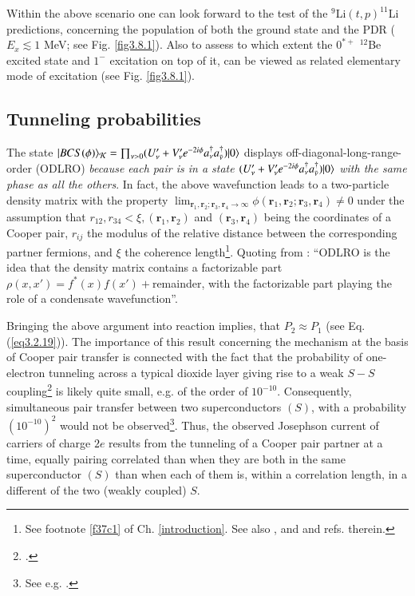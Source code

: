 Within the above scenario one can look forward to the test of the $^9$Li$(t,p)^{11}$Li predictions, concerning the population of both the ground state and the PDR ($E_x\lesssim1$ MeV; see Fig. \ref{fig3.8.1}). Also to assess to which extent the $0^{*+}$ $^{12}$Be excited state and $1^-$ excitation on top of it, can be viewed as related elementary mode of excitation (see Fig. \ref{fig3.8.1}).
 \subsection{Tunneling probabilities}\label{App4.B.3}
 The state $ |{BCS(\phi)} \rangle_{\mathcal K}=\prod_{\nu>0}(U'_\nu+V'_\nu e^{-2i\phi} a_\nu^\dagger a_{\bar{\nu}}^\dagger)|{0} \rangle$  displays off-diagonal-long-range-order (ODLRO) \textit{because each pair is in a state $(U'_\nu+V'_\nu e^{-2i\phi} a_\nu^\dagger a_{\bar{\nu}}^\dagger)|{0} \rangle$ with the same phase as all the others}. In fact, the above wavefunction  leads to a two-particle density matrix with the property $\lim_{\mathbf r_1, \mathbf r_2;\mathbf r_3, \mathbf r_4\rightarrow\infty}\phi(\mathbf r_1, \mathbf r_2;\mathbf r_3, \mathbf r_4)\neq 0$ under the assumption that $r_{12}, r_{34}<\xi, (\mathbf r_1, \mathbf r_2)$ and $(\mathbf r_3, \mathbf r_4)$ being the coordinates of a Cooper pair, $r_{ij}$ the  modulus of the  relative distance between the corresponding partner fermions, and $\xi$ the coherence length\footnote{See footnote \ref{f37c1} of Ch. \ref{introduction}. See also \cite{Ambegaokar:69}, and \cite{Potel:17} and refs. therein.}. Quoting from \cite{Anderson:96}: ``ODLRO 
  is the idea that the density matrix contains a factorizable part $\rho(x,x')=f^*(x)f(x')+$remainder, with the factorizable part playing the role of a condensate wavefunction''.
 
 
 
Bringing the above argument into reaction implies, that $P_2\approx P_1$  (see Eq. (\ref{eq3.2.19})).
 The importance of this result  concerning the mechanism at the basis of Cooper pair transfer is connected with the fact that the probability of one-electron tunneling across a typical dioxide layer giving rise to a weak $S-S$ coupling\footnote{\cite{Pippard:12}.} is likely quite small, e.g.  of the order of $10^{-10}$. Consequently, simultaneous pair transfer between two superconductors $(S)$, with a probability  $(10^{-10})^2$ would not be observed\footnote{See e.g. \cite{McDonald:01}.}. Thus, the observed Josephson current of carriers of charge $2e$ results from the tunneling of a Cooper pair partner at a time, equally pairing correlated than when they are both in the same superconductor $(S)$ than when each of them is, within a correlation length,  in a different of the two (weakly coupled) $S$. 

